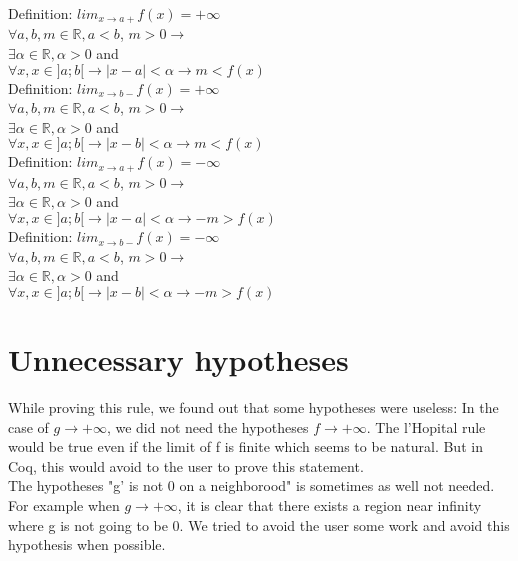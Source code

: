 \documentclass[11pt]{article}
\begin{document}
Definition: $lim_{x \rightarrow a+} f (x) =  +\infty$\\
$\forall a, b, m\in \mathbb{R}, a < b$, $m > 0 \rightarrow$ \\
$\exists \alpha \in \mathbb{R}, \alpha > 0 $ and \\
$\forall x, x \in ]a; b[ \rightarrow |x - a| < \alpha \rightarrow m < f(x)$
\\
Definition: $lim_{x \rightarrow b-} f (x) =  +\infty$\\
$\forall a, b, m\in \mathbb{R}, a < b$, $m > 0 \rightarrow$ \\
$\exists \alpha \in \mathbb{R}, \alpha > 0 $ and \\
$\forall x, x \in ]a; b[ \rightarrow |x - b| < \alpha \rightarrow m < f(x)$
\\
Definition: $lim_{x \rightarrow a+} f (x) =  -\infty$\\
$\forall a, b, m\in \mathbb{R}, a < b$, $m > 0 \rightarrow$ \\
$\exists \alpha \in \mathbb{R}, \alpha > 0 $ and \\
$\forall x, x \in ]a; b[ \rightarrow |x - a| < \alpha \rightarrow -m > f(x)$
\\
Definition: $lim_{x \rightarrow b-} f (x) =  -\infty$\\
$\forall a, b, m\in \mathbb{R}, a < b$, $m > 0 \rightarrow$ \\
$\exists \alpha \in \mathbb{R}, \alpha > 0 $ and \\
$\forall x, x \in ]a; b[ \rightarrow |x - b| < \alpha \rightarrow -m > f(x)$
\\


\section{Unnecessary hypotheses}

While proving this rule, we found out that some hypotheses were useless: 
In the case of $g \rightarrow +\infty$, we did not need the hypotheses $f \rightarrow +\infty$. The l'Hopital rule would be true even if 
the limit of f is finite which seems to be natural. But in Coq, this would avoid to the user to prove this statement. \\%
The hypotheses "g' is not 0 on a neighborood" is sometimes as well not needed. For example when $g \rightarrow +\infty$, it is clear that there exists a region near infinity
where g is not going to be 0. We tried to avoid the user some work and avoid this hypothesis when possible.\\
\end{document}
